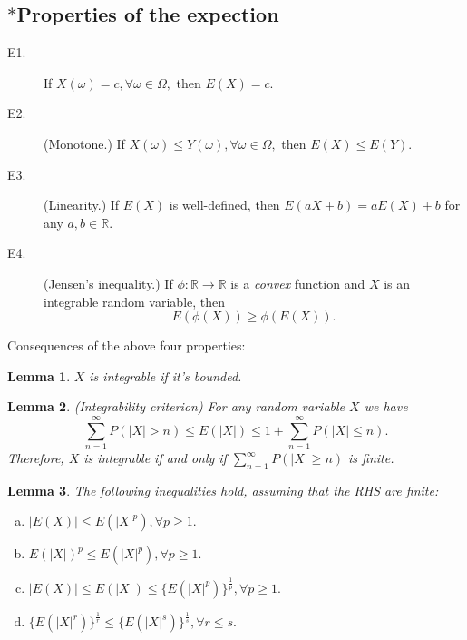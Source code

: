 \documentclass[12pt]{report} \addtolength{\textheight}{2in}
\newtheorem{lemma}{Lemma}
\newcommand{\Realnum}{\mathbb{R}}
\begin{document}
 \subsection*{\Large$\ast$Properties of the expection}
 \begin{description}
 \item[E1.] If $X(\omega)=c, \forall \omega \in \Omega,$ then $E(X)=c.$
 \item [E2.] (Monotone.) If $X(\omega) \leq Y(\omega), \forall \omega \in \Omega,$ then $E(X) \leq E(Y).$
 \item[E3.] (Linearity.) If $E(X)$ is well-defined, then $E(aX+b)=aE(X)+b$ for any $a,b \in \Realnum.$
 \item[E4.] (Jensen's inequality.) If $\phi: \Realnum \to \Realnum$ is a \textit{convex} function and $X$ is an integrable random variable, then
 \begin{displaymath}
 E(\phi(X)) \geq \phi(E(X)).
 \end{displaymath}
 \end{description}
 Consequences of the above four properties:
 \begin{lemma}
$ X$ is integrable if it's bounded.
 \end{lemma}
 \begin{lemma}  (Integrability criterion)
For any random variable $X$ we have 
\begin{displaymath}
\sum_{n=1}^{\infty}P(|X| >n )\leq E(|X|) \leq 1+\sum_{n=1}^{\infty} P(|X| \leq n).
\end{displaymath}
Therefore, $X$ is integrable if and only if $\sum_{n=1}^{\infty} P(|X|\geq n)$ is finite.
 \end{lemma}
 \begin{lemma}
 The following inequalities hold, assuming that the RHS are finite:
 \begin{enumerate} [(a)]
 \item $|E(X)| \leq E(|X|^p), \forall p \geq 1.$
 \item $E(|X|)^p \leq E(|X|^p), \forall p \geq 1.$
 \item$ |E(X)| \leq E(|X|) \leq \{E(|X|^p)\}^{\frac{1}{p}}, \forall p \geq 1.$
 \item $\{E(|X|^r)\}^{\frac{1}{r}} \leq \{E(|X|^s)\}^{\frac{1}{s}}, \forall r \leq s.$
 \end{enumerate}
 \end{lemma}
\end{document}
